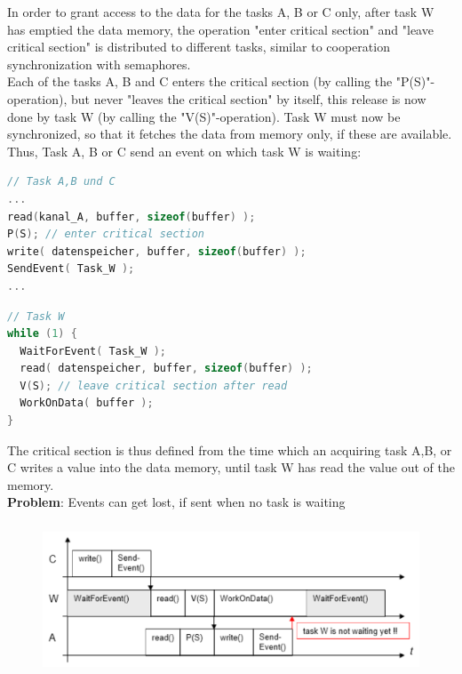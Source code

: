In order to grant access to the data for the tasks A, B or C only, after task W has emptied the data memory, the operation "enter critical section" and "leave critical section" is distributed to different tasks, similar to cooperation synchronization with semaphores.\\

Each of the tasks A, B and C enters the critical section (by calling the "P(S)"-operation), but never "leaves the critical section" by itself, this release is now done by task W (by calling the "V(S)"-operation). Task W must now be synchronized, so that it fetches the data from memory only, if these are available. Thus, Task A, B or C send an event on which task W is waiting:\\

\begin{lstlisting}[style=mystyle, language=c]
// Task A,B und C
...
read(kanal_A, buffer, sizeof(buffer) );
P(S); // enter critical section
write( datenspeicher, buffer, sizeof(buffer) );
SendEvent( Task_W );
...
\end{lstlisting}

\begin{lstlisting}[style=mystyle, language=c]
// Task W
while (1) {
  WaitForEvent( Task_W );
  read( datenspeicher, buffer, sizeof(buffer) );
  V(S); // leave critical section after read
  WorkOnData( buffer );
}
\end{lstlisting}

The critical section is thus defined from the time which an acquiring task A,B, or C writes a value into the data memory, until task W has read the value out of the memory.\\

\textbf{Problem}: Events can get lost, if sent when no task is waiting

 	\begin{figure}[h]
    \centering
    \includegraphics[width=14cm, height=4.5cm]{Images/image112.png}
    \label{fig:Fig 59}
    \end{figure}

